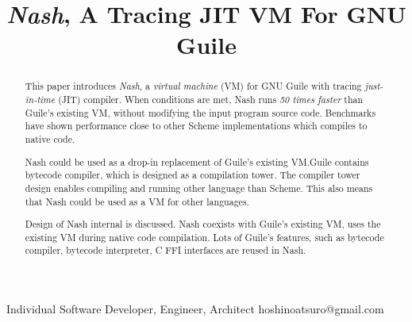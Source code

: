 \documentclass[preprint, numbers]{sigplanconf}
\begin{document}
\setlength{\pdfpageheight}{\paperheight}
\setlength{\pdfpagewidth}{\paperwidth}




\title{\textit{Nash}, A Tracing JIT VM For GNU Guile}

           {Individual Software Developer, Engineer, Architect}
           {hoshinoatsuro@gmail.com}

\maketitle

\begin{abstract}

This paper introduces \textit{Nash}, a \textit{virtual machine} (VM) for GNU
Guile with tracing \textit{just-in-time} (JIT) compiler. When conditions are
met, Nash runs \textit{50 times faster} than Guile's existing VM, without
modifying the input program source code. Benchmarks have shown performance
close to other Scheme implementations which compiles to native code.

Nash could be used as a drop-in replacement of Guile's existing VM.\@ Guile
contains bytecode compiler, which is designed as a compilation tower. The
compiler tower design enables compiling and running other language than
Scheme. This also means that Nash could be used as a VM for other languages.

Design of Nash internal is discussed. Nash coexists with Guile's existing VM,
uses the existing VM during native code compilation. Lots of Guile's features,
such as bytecode compiler, bytecode interpreter, C FFI interfaces are reused
in Nash.



\end{abstract}
\end{document}
